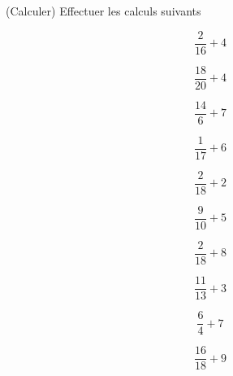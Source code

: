  (Calculer) Effectuer les calculs suivants

\begin{multicols}{5}
$$\dfrac{2}{16}+4$$

$$\dfrac{18}{20}+4$$

$$\dfrac{14}{6}+7$$

$$\dfrac{1}{17}+6$$

$$\dfrac{2}{18}+2$$

$$\dfrac{9}{10}+5$$

$$\dfrac{2}{18}+8$$

$$\dfrac{11}{13}+3$$

$$\dfrac{6}{4}+7$$

$$\dfrac{16}{18}+9$$

\end{multicols}